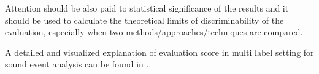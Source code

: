 Attention should be also paid to statistical significance of the results and it should be used to calculate the theoretical limits of discriminability of the evaluation, especially when two methods/approaches/techniques are compared.


A detailed and visualized explanation of evaluation score in multi label setting for sound event analysis can be found in  \cite{mesaros2016metrics}.







%

